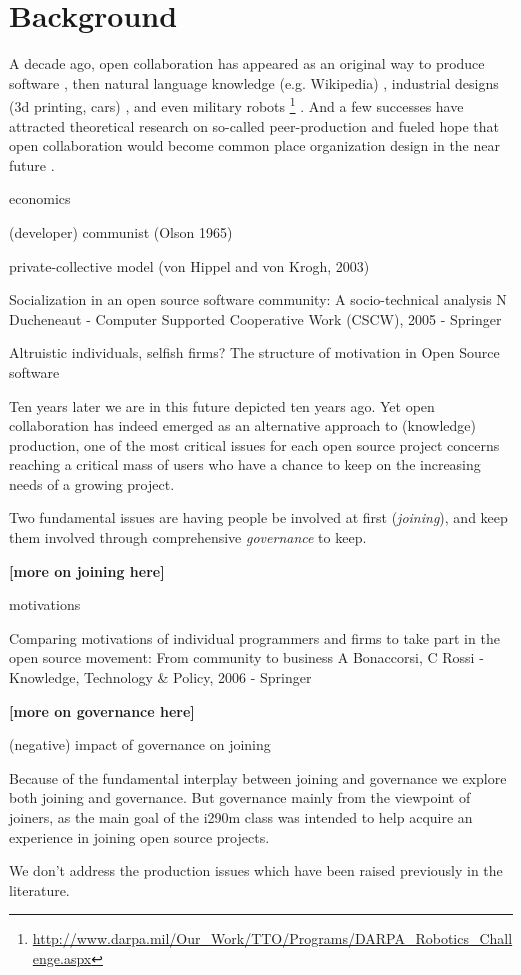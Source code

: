 \section{Background}

A decade ago, open collaboration has appeared as an original way to produce software \cite{}, then natural language knowledge (e.g. Wikipedia) , industrial designs (3d printing, cars) \cite{pearce2012}, and even military robots \footnote{\url{http://www.darpa.mil/Our_Work/TTO/Programs/DARPA_Robotics_Challenge.aspx}} . And a few successes have attracted theoretical research on so-called peer-production and fueled hope that open collaboration would become common place organization design in the near future \cite{benkler2002}. 

economics \cite{lerner2002}

(developer) communist (Olson 1965)

private-collective model (von Hippel and von Krogh, 2003)


Socialization in an open source software community: A socio-technical analysis
N Ducheneaut - Computer Supported Cooperative Work (CSCW), 2005 - Springer


Altruistic individuals, selfish firms? The structure of motivation in Open Source software \cite{bonaccorsi2004ais}


Ten years later we are in this future depicted ten years ago. Yet open collaboration has indeed emerged as an alternative approach to (knowledge) production, one of the most critical issues for each open source project concerns reaching a critical mass of users who have a chance to keep on the increasing needs of a growing project. 

Two fundamental issues are having people be involved at first ({\it joining}), and keep them involved through comprehensive {\it governance} to keep.

{\bf [more on joining here]}

motivations

Comparing motivations of individual programmers and firms to take part in the open source movement: From community to business
A Bonaccorsi, C Rossi - Knowledge, Technology \& Policy, 2006 - Springer


{\bf [more on governance here]} 

 \cite{O'Mahony2007}

(negative) impact of governance on joining \cite{halfacker2013}

Because of the fundamental interplay between joining and governance we explore both joining and governance. But governance mainly from the viewpoint of joiners, as the main goal of the i290m class was intended to help acquire an experience in joining open source projects.

We don't address the production issues which have been raised previously in the literature.


\cite{tomlinson2012}

